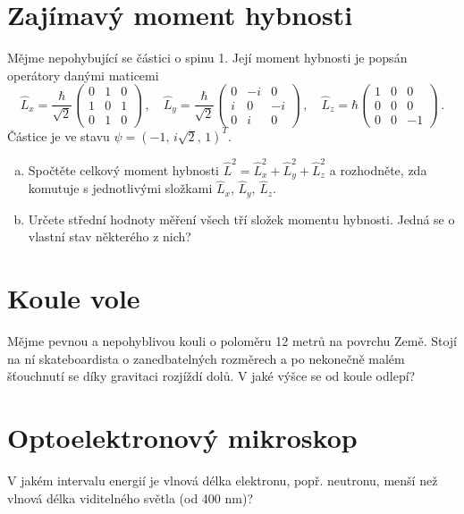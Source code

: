 \documentclass[10pt,a4paper,landscape]{article}
\begin{document}
\begin{multicols}{2}[]
\section{Zajímavý moment hybnosti}
Mějme nepohybující se částici o spinu 1. Její moment hybnosti je popsán operátory danými maticemi
\begin{equation}
\hat{L}_x = \frac{\hbar}{\sqrt{2}}\begin{pmatrix}0 & 1 & 0\\ 1 & 0 & 1\\ 0 & 1 & 0\end{pmatrix} \,,\quad
\hat{L}_y = \frac{\hbar}{\sqrt{2}}\begin{pmatrix}0 &-i & 0\\ i & 0 &-i\\ 0 & i & 0\end{pmatrix} \,,\quad
\hat{L}_z =       \hbar           \begin{pmatrix}1 & 0 & 0\\ 0 & 0 & 0\\ 0 & 0 &-1\end{pmatrix} \,.
\end{equation}
Částice je ve stavu $\psi = \left(-1,\, i\sqrt{2},\, 1\right)^T$.
\begin{enumerate}[a)]
\item Spočtěte celkový moment hybnosti $\hat{L}^2 = \hat{L}_x^2 + \hat{L}_y^2 + \hat{L}_z^2$ a rozhodněte, zda komutuje s jednotlivými složkami $\hat{L}_x,\,\hat{L}_y,\,\hat{L}_z$.
\item Určete střední hodnoty měření všech tří složek momentu hybnosti. Jedná se o vlastní stav některého z nich?
\end{enumerate}

\section{Koule vole}
Mějme pevnou a nepohyblivou kouli o poloměru 12 metrů na povrchu Země. Stojí na ní skateboardista o zanedbatelných rozměrech a po nekonečně malém šťouchnutí se díky gravitaci rozjíždí dolů. V jaké výšce se od koule odlepí?

\section{Optoelektronový mikroskop}
V jakém intervalu energií je vlnová délka elektronu, popř. neutronu, menší než vlnová délka viditelného světla (od 400 nm)?


\end{multicols}
\end{document}
